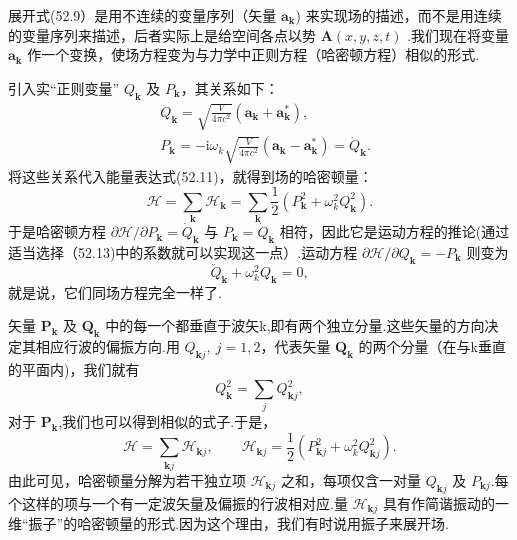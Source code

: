 展开式(52.9）是用不连续的变量序列（矢量 $\boldsymbol{a}_{\boldsymbol{k}}$) 来实现场的描述，而不是用连续的变量序列来描述，后者实际上是给空间各点以势 $\boldsymbol{A}(x,y,z,t)$ .我们现在将变量 $\boldsymbol{a}_{\boldsymbol{k}}$ 作一个变换，使场方程变为与力学中正则方程（哈密顿方程）相似的形式.

引入实“正则变量” $Q_{\boldsymbol{k}}$ 及 $P_{\boldsymbol{k}}$，其关系如下：
\begin{equation}
\begin{aligned}
  &Q_{\boldsymbol{k}}=\sqrt{\frac{V}{4\pi c^2}}
  (\boldsymbol{a}_{\boldsymbol{k}}+\boldsymbol{a}_{\boldsymbol{k}}^*),\\
  &P_{\boldsymbol{k}}=-\mathrm{i}\omega_k\sqrt{\frac{V}{4\pi c^2}}
  (\boldsymbol{a}_{\boldsymbol{k}}-\boldsymbol{a}_{\boldsymbol{k}}^*)=\dot{Q}_{\boldsymbol{k}}.
\end{aligned}
\end{equation}
将这些关系代入能量表达式(52.11)，就得到场的哈密顿量：
\begin{equation}
  \mathcal{H}=\sum_{\boldsymbol{k}}\mathcal{H}_{\boldsymbol{k}}
  =\sum_{\boldsymbol{k}}\frac{1}{2}
  (P_{\boldsymbol{k}}^2+\omega_k^2Q_{\boldsymbol{k}}^2).
\end{equation}
于是哈密顿方程 $\partial\mathcal{H}/\partial P_{\boldsymbol{k}} = \dot{Q}_{\boldsymbol{k}}$ 与 $P_{\boldsymbol{k}} = \dot{Q}_{\boldsymbol{k}}$ 相符，因此它是运动方程的推论(通过适当选择（52.13)中的系数就可以实现这一点）.运动方程 $\partial\mathcal{H}/\partial Q_{\boldsymbol{k}} = -P_{\boldsymbol{k}}$ 则变为
\begin{equation}
  \ddot{Q}_{\boldsymbol{k}}+\omega_k^2Q_{\boldsymbol{k}}=0,
\end{equation}
就是说，它们同场方程完全一样了.

矢量 $\boldsymbol{P}_{\boldsymbol{k}}$ 及 $\boldsymbol{Q}_{\boldsymbol{k}}$ 中的每一个都垂直于波矢k,即有两个独立分量.这些矢量的方向决定其相应行波的偏振方向.用 $Q_{\boldsymbol{k}j},\ j = 1,2$，代表矢量 $\boldsymbol{Q}_{\boldsymbol{k}}$ 的两个分量（在与k垂直的平面内)，我们就有
\begin{equation*}
  Q_{\boldsymbol{k}}^2=\sum_j Q_{\boldsymbol{k}j}^2,
\end{equation*}
对于 $\boldsymbol{P}_{\boldsymbol{k}}$,我们也可以得到相似的式子.于是，
\begin{equation}
  \mathcal{H}=\sum_{\boldsymbol{k}j}\mathcal{H}_{\boldsymbol{k}j},\qquad
  \mathcal{H}_{\boldsymbol{k}j}
  =\frac{1}{2}(P_{\boldsymbol{k}j}^2+\omega_k^2Q_{\boldsymbol{k}j}^2).
\end{equation}
由此可见，哈密顿量分解为若干独立项 $\mathcal{H}_{\boldsymbol{k}j}$ 之和，每项仅含一对量 $Q_{\boldsymbol{k}j}$ 及 $P_{\boldsymbol{k}j}$.每个这样的项与一个有一定波矢量及偏振的行波相对应.量 $\mathcal{H}_{\boldsymbol{k}j}$ 具有作简谐振动的一维“振子”的哈密顿量的形式.因为这个理由，我们有时说用振子来展开场.


